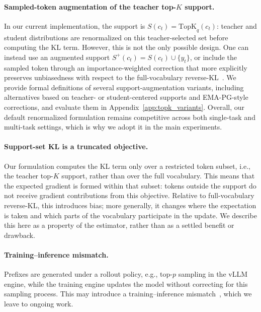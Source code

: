 \documentclass{article}
\begin{document}
\paragraph{Sampled-token augmentation of the teacher top-$K$ support.} In our current implementation, the support is $S(c_t)=\mathrm{TopK}_q(c_t)$: teacher and student distributions are renormalized on this teacher-selected set before computing the KL term. However, this is not the only possible design. One can instead use an augmented support $S^+(c_t)=S(c_t)\cup\{y_t\}$, or include the sampled token through an importance-weighted correction that more explicitly preserves unbiasedness with respect to the full-vocabulary reverse-KL~\citep{emapg2026}.
We provide formal definitions of several support-augmentation variants, including alternatives based on teacher- or student-centered supports and EMA-PG-style corrections, and evaluate them in Appendix~\ref{app:topk_variants}. Overall, our default renormalized formulation remains competitive across both single-task and multi-task settings, which is why we adopt it in the main experiments.

\paragraph{Support-set KL is a truncated objective.} Our formulation computes the KL term only over a restricted token subset, i.e., the teacher top-$K$ support, rather than over the full vocabulary. This means that the expected gradient is formed within that subset: tokens outside the support do not receive gradient contributions from this objective. Relative to full-vocabulary reverse-KL, this introduces bias; more generally, it changes where the expectation is taken and which parts of the vocabulary participate in the update.
We describe this here as a property of the estimator, rather than as a settled benefit or drawback.

\paragraph{Training--inference mismatch.} Prefixes are generated under a rollout policy, e.g., top-$p$ sampling in the vLLM engine, while the training engine updates the model without correcting for this sampling process. This may introduce a training--inference mismatch~\citep{liu-li-2025-rl-collapse,yao2025offpolicy}, which we leave to ongoing work.
\end{document}
